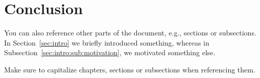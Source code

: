 \section{Conclusion}
\label{sec:conclusion}

You can also reference other parts of the document, e.g., sections or subsections.
In Section~\ref{sec:intro} we briefly introduced something, whereas in Subsection~\ref{sec:intro:sub:motivation}, we motivated something else.

Make sure to capitalize chapters, sections or subsections when referencing them.
